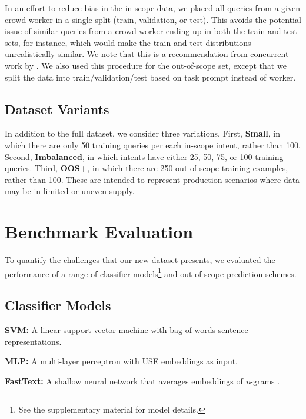 \documentclass[11pt,a4paper]{article}
\newcommand{\tightparagraph}[1]{\noindent\textbf{#1:}}
\begin{document}
In an effort to reduce bias in the in-scope data, we placed all queries from a given crowd worker in a single split (train, validation, or test). This avoids the potential issue of similar queries from a crowd worker ending up in both the train and test sets, for instance, which would make the train and test distributions unrealistically similar. We note that this is a recommendation from concurrent work by \citet{geva-2019}. We also used this procedure for the out-of-scope set, except that we split the data into train/validation/test based on task prompt instead of worker.

\subsection{Dataset Variants}
In addition to the full dataset, we consider three variations.
First, \textbf{Small}, in which there are only 50 training queries per each in-scope intent, rather than 100.
Second, \textbf{Imbalanced}, in which intents have either 25, 50, 75, or 100 training queries.
Third, \textbf{OOS+}, in which there are 250 out-of-scope training examples, rather than 100.
These are intended to represent production scenarios where data may be in limited or uneven supply.

\section{Benchmark Evaluation}

To quantify the challenges that our new dataset presents, we evaluated the performance of a range of classifier models\footnote{See the supplementary material for model details.}
and out-of-scope prediction schemes.

\subsection{Classifier Models}

\tightparagraph{SVM}
A linear support vector machine with bag-of-words sentence representations.
%
%

\tightparagraph{MLP}
A multi-layer perceptron with USE embeddings \citep{USE} as input.

\tightparagraph{FastText}
A shallow neural network that averages embeddings of \textit{n}-grams \citep{fasttext}.
\end{document}
